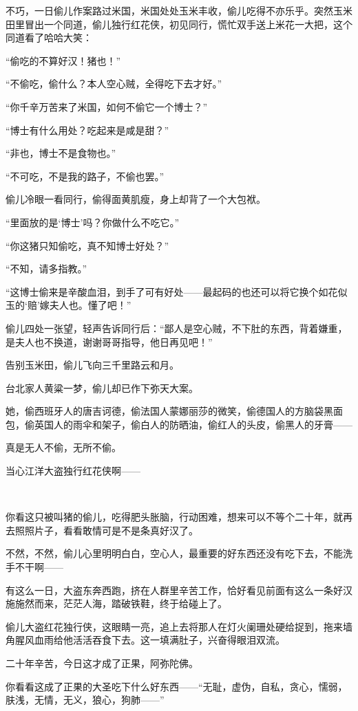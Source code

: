 \par 不巧，一日偷儿作案路过米国，米国处处玉米丰收，偷儿吃得不亦乐乎。突然玉米田里冒出一个同道，偷儿独行红花侠，初见同行，慌忙双手送上米花一大把，这个同道看了哈哈大笑：
\par “偷吃的不算好汉！猪也！”
\par “不偷吃，偷什么？本人空心贼，全得吃下去才好。”
\par “你千辛万苦来了米国，如何不偷它一个博士？”
\par “博士有什么用处？吃起来是咸是甜？”
\par “非也，博士不是食物也。”
\par “不可吃，不是我的路子，不偷也罢。”
\par 偷儿冷眼一看同行，偷得面黄肌瘦，身上却背了一个大包袱。
\par “里面放的是‘博士’吗？你做什么不吃它。”
\par “你这猪只知偷吃，真不知博士好处？”
\par “不知，请多指教。”
\par “这博士偷来是辛酸血泪，到手了可有好处——最起码的也还可以将它换个如花似玉的‘赔’嫁夫人也。懂了吧！”
\par 偷儿四处一张望，轻声告诉同行后：“鄙人是空心贼，不下肚的东西，背着嫌重，是夫人也不换道，谢谢哥哥指导，他日再见吧！”
\par 告别玉米田，偷儿飞向三千里路云和月。
\par 台北家人黄粱一梦，偷儿却已作下弥天大案。
\par 她，偷西班牙人的唐吉诃德，偷法国人蒙娜丽莎的微笑，偷德国人的方脑袋黑面包，偷英国人的雨伞和架子，偷白人的防晒油，偷红人的头皮，偷黑人的牙膏——
\par 真是无人不偷，无所不偷。
\par 当心江洋大盗独行红花侠啊——
\par  
\par 你看这只被叫猪的偷儿，吃得肥头胀脑，行动困难，想来可以不等个二十年，就再去照照片子，看看敢情可是不是条真好汉了。
\par 不然，不然，偷儿心里明明白白，空心人，最重要的好东西还没有吃下去，不能洗手不干啊——
\par 有这么一日，大盗东奔西跑，挤在人群里辛苦工作，恰好看见前面有这么一条好汉施施然而来，茫茫人海，踏破铁鞋，终于给碰上了。
\par 偷儿大盗红花独行侠，这眼睛一亮，追上去将那人在灯火阑珊处硬给捉到，拖来墙角腥风血雨给他活活吞食下去。这一填满肚子，兴奋得眼泪双流。
\par 二十年辛苦，今日这才成了正果，阿弥陀佛。
\par 你看看这成了正果的大圣吃下什么好东西——“无耻，虚伪，自私，贪心，懦弱，肤浅，无情，无义，狼心，狗肺——”
